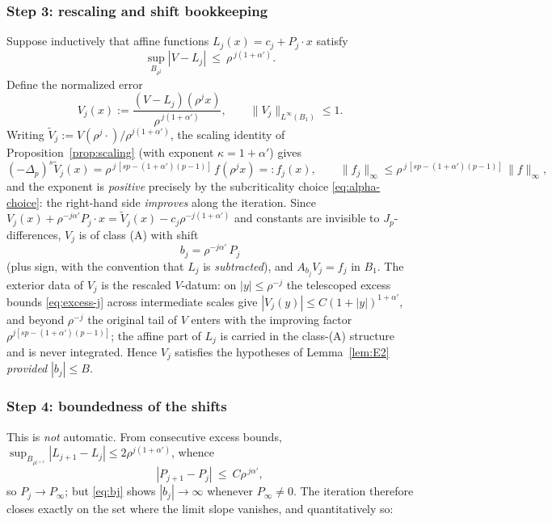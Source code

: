 \documentclass[11pt]{amsart}
\theoremstyle{plain}
\theoremstyle{definition}
\theoremstyle{remark}
\newcommand{\fpl}[1]{(-\Delta_p)^{s}#1}
\newcommand{\al}{\alpha}
\begin{document}
\subsubsection*{Step 3: rescaling and shift bookkeeping}
Suppose inductively that affine functions $L_j(x)=c_j+P_j\cdot x$ satisfy
\begin{equation}\label{eq:excess-j}
  \sup_{B_{\rho^j}}|V-L_j|\ \le\ \rho^{\,j(1+\al')} .
\end{equation}
Define the normalized error
\[
  V_j(x):=\frac{(V-L_j)(\rho^jx)}{\rho^{\,j(1+\al')}} ,
  \qquad \|V_j\|_{L^\infty(B_1)}\le1 .
\]
Writing $\widetilde V_j:=V(\rho^j\cdot)/\rho^{j(1+\al')}$, the scaling
identity of Proposition~\ref{prop:scaling} \textnormal{(}with exponent
$\kappa=1+\al'$\textnormal{)} gives
\begin{equation}\label{eq:fj}
  \fpl{\widetilde V_j}(x)
  =\rho^{\,j\,[sp-(1+\al')(p-1)]}\,f(\rho^jx)=:f_j(x),
  \qquad
  \|f_j\|_\infty\le\rho^{\,j\,[sp-(1+\al')(p-1)]}\,\|f\|_\infty ,
\end{equation}
and the exponent is \emph{positive} precisely by the subcriticality choice
\eqref{eq:alpha-choice}: the right-hand side \emph{improves} along the
iteration. Since
$V_j(x)+\rho^{-j\al'}P_j\cdot x=\widetilde V_j(x)-c_j\rho^{-j(1+\al')}$
and constants are invisible to $J_p$-differences, $V_j$ is of class
\textnormal{(A)} with shift
\begin{equation}\label{eq:bj}
  \boxed{\;b_j=\rho^{-j\al'}\,P_j\;}
\end{equation}
\textnormal{(}plus sign, with the convention that $L_j$ is
\emph{subtracted}\textnormal{)}, and $A_{b_j}V_j=f_j$ in $B_1$. The
exterior data of $V_j$ is the rescaled $V$-datum: on $|y|\le\rho^{-j}$ the
telescoped excess bounds \eqref{eq:excess-j} across intermediate scales
give $|V_j(y)|\le C(1+|y|)^{1+\al'}$, and beyond $\rho^{-j}$ the original
tail of $V$ enters with the improving factor
$\rho^{j[sp-(1+\al')(p-1)]}$; the affine part of $L_j$ is carried in the
class-\textnormal{(A)} structure and is never integrated. Hence $V_j$
satisfies the hypotheses of Lemma~\ref{lem:E2} \emph{provided}
$|b_j|\le B$.

\subsubsection*{Step 4: boundedness of the shifts}
This is \emph{not} automatic. From consecutive excess bounds,
$\sup_{B_{\rho^{j+1}}}|L_{j+1}-L_j|\le2\rho^{j(1+\al')}$, whence
\begin{equation}\label{eq:slope-tel}
  |P_{j+1}-P_j|\ \le\ C\rho^{\,j\al'} ,
\end{equation}
so $P_j\to P_\infty$; but \eqref{eq:bj} shows $|b_j|\to\infty$ whenever
$P_\infty\neq0$. The iteration therefore closes exactly on the set where
the limit slope vanishes, and quantitatively so:
\end{document}
